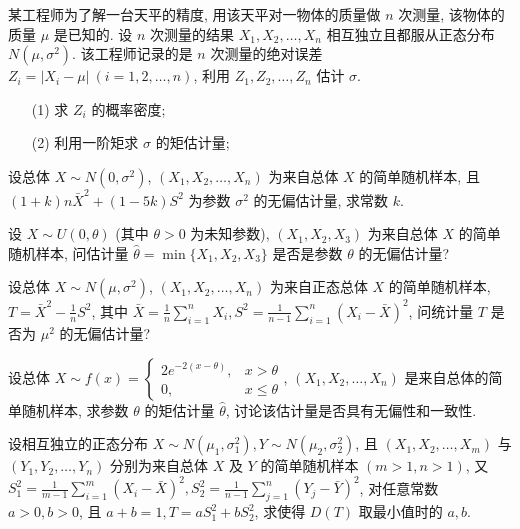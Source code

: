 \documentclass[padp]{ExBook}
\begin{document}
\begin{qitems}
    \begin{bbox}
        \qitem   某工程师为了解一台天平的精度, 用该天平对一物体的质量做 $n$ 次测量, 该物体的质量 $\mu$ 是已知的. 设 $n$ 次测量的结果 $X_1, X_2, \dots, X_n$ 相互独立且都服从正态分布 $N(\mu, \sigma^2)$. 该工程师记录的是 $n$ 次测量的绝对误差 $Z_i = |X_i - \mu| \ (i=1, 2, \dots, n)$, 利用 $Z_1, Z_2, \dots, Z_n$ 估计 $\sigma$.
\begin{enumerate}
    \item[(1)] 求 $Z_i$ 的概率密度;
    \item[(2)] 利用一阶矩求 $\sigma$ 的矩估计量;
\end{enumerate}
    \end{bbox}
    \begin{bbox}
        \qitem    设总体 $X \sim N(0, \sigma^2)$, $(X_1, X_2, \dots, X_n)$ 为来自总体 $X$ 的简单随机样本, 且 $(1+k)n\bar{X}^2 + (1-5k)S^2$ 为参数 $\sigma^2$ 的无偏估计量, 求常数 $k$.
    \end{bbox}
    \begin{bbox}
        \qitem   设 $X \sim U(0, \theta)$ (其中 $\theta > 0$ 为未知参数), $(X_1, X_2, X_3)$ 为来自总体 $X$ 的简单随机样本, 问估计量 $\hat{\theta} = \min\{X_1, X_2, X_3\}$ 是否是参数 $\theta$ 的无偏估计量?
    \end{bbox}
    \begin{bbox}
        \qitem    设总体 $X \sim N(\mu, \sigma^2)$, $(X_1, X_2, \dots, X_n)$ 为来自正态总体 $X$ 的简单随机样本, $T = \bar{X}^2 - \frac{1}{n}S^2$, 其中 $\bar{X} = \frac{1}{n}\sum_{i=1}^{n}X_i, S^2 = \frac{1}{n-1}\sum_{i=1}^{n}(X_i - \bar{X})^2$, 问统计量 $T$ 是否为 $\mu^2$ 的无偏估计量?
    \end{bbox}
    \begin{bbox}
        \qitem    设总体 $X \sim f(x) = 
\begin{cases}
2e^{-2(x-\theta)}, & x > \theta \\
0, & x \le \theta
\end{cases}
$, $(X_1, X_2, \dots, X_n)$ 是来自总体的简单随机样本, 求参数 $\theta$ 的矩估计量 $\hat{\theta}$, 讨论该估计量是否具有无偏性和一致性.
    \end{bbox}
    \begin{bbox}
        \qitem   设相互独立的正态分布 $X \sim N(\mu_1, \sigma_1^2), Y \sim N(\mu_2, \sigma_2^2)$, 且 $(X_1, X_2, \dots, X_m)$ 与 $(Y_1, Y_2, \dots, Y_n)$ 分别为来自总体 $X$ 及 $Y$ 的简单随机样本 $(m>1, n>1)$, 又
$S_1^2 = \frac{1}{m-1}\sum_{i=1}^{m}(X_i - \bar{X})^2, S_2^2 = \frac{1}{n-1}\sum_{j=1}^{n}(Y_j - \bar{Y})^2$,
对任意常数 $a > 0, b > 0$, 且 $a+b=1, T = aS_1^2 + bS_2^2$, 求使得 $D(T)$ 取最小值时的 $a, b$.

\end{bbox}
\end{qitems}
\end{document}
